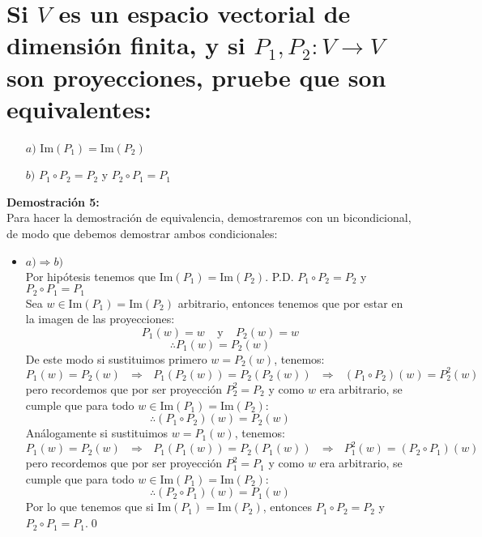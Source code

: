 \section{Si $V$ es un espacio vectorial de dimensión finita, y si $P_1,P_2: V \longrightarrow V$ son proyecciones, pruebe que
son equivalentes:}
\begin{itemize}
    \item [$a)$] $\text{Im}(P_1) = \text{Im}(P_2)$
    \item [$b)$] $P_1 \circ P_2 = P_2$ y $P_2 \circ P_1 = P_1$
    
\end{itemize}
\textbf{Demostraci\'on 5:}\\
Para hacer la demostraci\'on de equivalencia, demostraremos con un bicondicional, de modo que debemos demostrar ambos condicionales:
\begin{itemize}
    \item $a)\Longrightarrow b)$\\
    Por hip\'otesis tenemos que $\text{Im}(P_1) = \text{Im}(P_2)$. P.D. $P_1 \circ P_2 = P_2$ y $P_2 \circ P_1 = P_1$\\
    Sea $w\in \text{Im}(P_1) = \text{Im}(P_2)$ arbitrario, entonces tenemos que por estar en la imagen de las proyecciones:
    \[P_{1}(w)=w~~~~~\text{y}~~~~~P_2(w)=w\]
    \[\therefore P_1(w)=P_2(w)\]
    De este modo si sustituimos primero $w=P_2(w)$, tenemos:
    \[P_1(w)=P_2(w)~~~\Longrightarrow~~~P_1(P_2(w))=P_2(P_2(w))~~~\Longrightarrow~~~(P_1\circ P_2)(w)=P_2^2(w)\]pero recordemos que por ser proyecci\'on $P_2^2=P_2$ y como $w$ era arbitrario, se cumple que para todo $w\in \text{Im}(P_1) = \text{Im}(P_2)$:
    \[\therefore (P_1 \circ P_2)(w) = P_2(w)\]
    An\'alogamente si sustituimos $w=P_1(w)$, tenemos:
    \[P_1(w)=P_2(w)~~~\Longrightarrow~~~P_1(P_1(w))=P_2(P_1(w))~~~\Longrightarrow~~~P_1^2(w)=(P_2\circ P_1)(w)\]pero recordemos que por ser proyecci\'on $P_1^2=P_1$ y como $w$ era arbitrario, se cumple que para todo $w\in \text{Im}(P_1) = \text{Im}(P_2)$:
    \[\therefore (P_2 \circ P_1)(w) = P_1(w)\]
    Por lo que tenemos que si $\text{Im}(P_1) = \text{Im}(P_2)$, entonces $P_1 \circ P_2 = P_2$ y $P_2 \circ P_1 = P_1$.\qed
    

\end{itemize}
